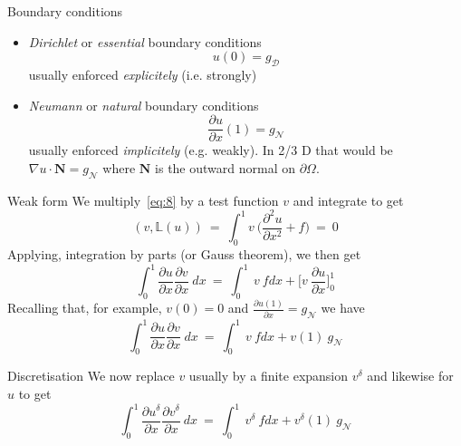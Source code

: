 \begin{frame}{Boundary conditions}
  \begin{itemize}
  \item \emph{Dirichlet} or \emph{essential} boundary conditions
    \begin{equation}
      \label{eq:10}
      u(0) = g_{\mathcal{D}}
    \end{equation}
    usually enforced \emph{explicitely} (i.e. strongly)
  \item \emph{Neumann} or \emph{natural} boundary conditions
    \begin{equation}
      \label{eq:11}
      \frac{\partial u}{\partial x}(1) = g_{\mathcal{N}}
    \end{equation}
    usually enforced \emph{implicitely} (e.g. weakly). In 2/3 D that
    would be $\nabla u \cdot \mathbf{N} = g_{\mathcal{N}}$ where $\mathbf{N}$ is the outward normal  on $\partial \Omega$.
  \end{itemize}
\end{frame}

\begin{frame}{Weak form}
  We multiply~\eqref{eq:8} by  a test function $v$ and integrate to get
  \begin{equation}
    \label{eq:12}
    (v, \mathbb{L}(u))\ =\ \int_0^1 v\ \Big( \frac{\partial^2 u}{\partial x^2} + f \Big)\ =\ 0
  \end{equation}
  Applying, integration by parts (or Gauss theorem), we then get
  \begin{equation}
    \label{eq:13}
    \int_0^1 \frac{\partial u}{\partial x}\frac{\partial v}{\partial x}\ dx\ =\  \int_0^1\ v\ f dx + \Big[ v\ \frac{\partial u}{\partial x} \Big]_0^1
  \end{equation}
  Recalling that, for example, $v(0) = 0$ and $\frac{\partial u(1)}{\partial x} = g_{\mathcal{N}}$ we have
  \begin{equation}
    \label{eq:14}
    \int_0^1 \frac{\partial u}{\partial x}\frac{\partial v}{\partial x}\ dx\ =\  \int_0^1\ v\ f dx + v(1)\ g_{\mathcal{N}}
  \end{equation}
\end{frame}
\begin{frame}{Discretisation}
  We now replace $v$ usually by a finite expansion $v^{\delta}$ and likewise for $u$ to get
  \begin{equation}
    \label{eq:16}
    \int_0^1 \frac{\partial u^{\delta}}{\partial x}\frac{\partial v^{\delta}}{\partial x}\ dx\ =\  \int_0^1\ v^{\delta}\ f dx + v^{\delta}(1)\ g_{\mathcal{N}}
  \end{equation}
\end{frame}

